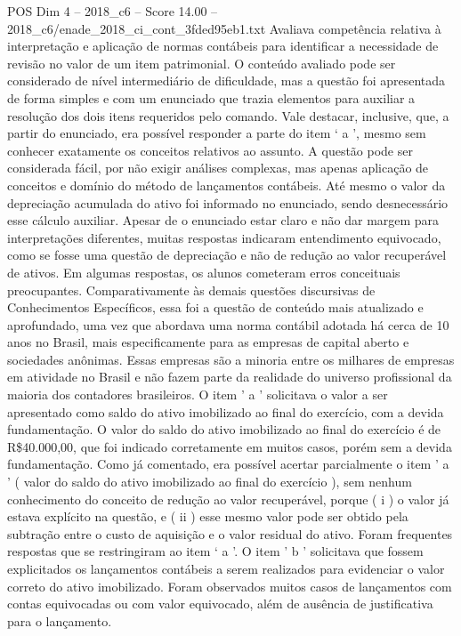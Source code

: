 \begin{textsample}{POS Dim 4 – 2018\_c6 – Score 14.00 – 2018\_c6/enade\_2018\_ci\_cont\_3fded95eb1.txt}
Avaliava competência relativa à interpretação e aplicação de normas contábeis para identificar a necessidade de revisão no valor de um item patrimonial.
O conteúdo avaliado pode ser considerado de nível intermediário de dificuldade, mas a questão foi apresentada de forma simples e com um enunciado que trazia elementos para auxiliar a resolução dos dois itens requeridos pelo comando.
Vale destacar, inclusive, que, a partir do enunciado, era possível responder a parte do item ‘ a ’, mesmo sem conhecer exatamente os conceitos relativos ao assunto.
A questão pode ser considerada fácil, por não exigir análises complexas, mas apenas aplicação de conceitos e domínio do método de lançamentos contábeis.
Até mesmo o valor da depreciação acumulada do ativo foi informado no enunciado, sendo desnecessário esse cálculo auxiliar.
Apesar de o enunciado estar claro e não dar margem para interpretações diferentes, muitas respostas indicaram entendimento equivocado, como se fosse uma questão de depreciação e não de redução ao valor recuperável de ativos.
Em algumas respostas, os alunos cometeram erros conceituais preocupantes.
Comparativamente às demais questões discursivas de Conhecimentos Específicos, essa foi a questão de conteúdo mais atualizado e aprofundado, uma vez que abordava uma norma contábil adotada há cerca de 10 anos no Brasil, mais especificamente para as empresas de capital aberto e sociedades anônimas.
Essas empresas são a minoria entre os milhares de empresas em atividade no Brasil e não fazem parte da realidade do universo profissional da maioria dos contadores brasileiros.
O item ' a ' solicitava o valor a ser apresentado como saldo do ativo imobilizado ao final do exercício, com a devida fundamentação.
O valor do saldo do ativo imobilizado ao final do exercício é de R\$40.000,00, que foi indicado corretamente em muitos casos, porém sem a devida fundamentação.
Como já comentado, era possível acertar parcialmente o item ' a ' ( valor do saldo do ativo imobilizado ao final do exercício ), sem nenhum conhecimento do conceito de redução ao valor recuperável, porque ( i ) o valor já estava explícito na questão, e ( ii ) esse mesmo valor pode ser obtido pela subtração entre o custo de aquisição e o valor residual do ativo.
Foram frequentes respostas que se restringiram ao item ‘ a ’.
O item ' b ' solicitava que fossem explicitados os lançamentos contábeis a serem realizados para evidenciar o valor correto do ativo imobilizado.
Foram observados muitos casos de lançamentos com contas equivocadas ou com valor equivocado, além de ausência de justificativa para o lançamento.

\end{textsample}

